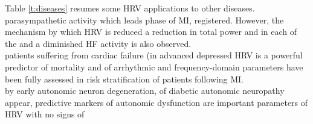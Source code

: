 \documentclass[12pt,lot, lof]{puthesis}
\begin{document}
Table \ref{t:diseases} resumes some \gls{HRV} applications to other diseases.\\

%
parasympathetic activity which leads
phase of MI,
registered. However, the mechanism by which \gls{HRV} is reduced
%
a reduction in total power and in each of the 
and a diminished \gls{HF} activity is also observed.\\
%
patients suffering from cardiac failure (in advanced
%
depressed \gls{HRV} is a powerful predictor of mortality and of arrhythmic
and frequency-domain parameters have been fully assessed in 
risk stratification of patients following MI.\\
%
%
by early autonomic neuron degeneration,
of diabetic autonomic neuropathy appear,
predictive markers of autonomic dysfunction are important
% 
parameters of \gls{HRV} 
with no signs of 
\end{document}

